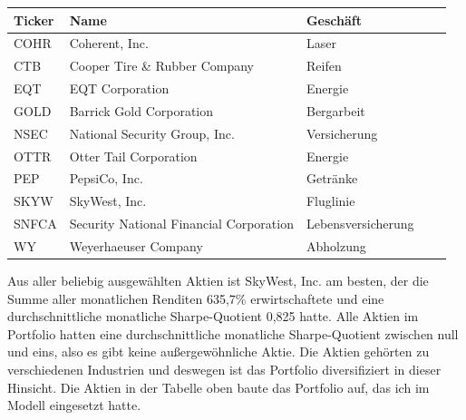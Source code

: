 \documentclass[12pt]{article}
\begin{document}
            \begin{table}[htp]
                \begin{center}
                    
                    \begin{tabular}{ | l | l | l | l | l | }

                        \hline
                        \textbf{Ticker}      & \textbf{Name}                             & \textbf{Geschäft} \\
                        \hline
                        COHR                 & Coherent, Inc.                            & Laser \\
                        CTB                  & Cooper Tire \& Rubber Company             & Reifen \\
                        EQT                  & EQT Corporation                           & Energie \\
                        GOLD                 & Barrick Gold Corporation                  & Bergarbeit \\
                        NSEC                 & National Security Group, Inc.             & Versicherung \\
                        OTTR                 & Otter Tail Corporation                    & Energie \\
                        PEP                  & PepsiCo, Inc.                             & Getränke \\
                        SKYW                 & SkyWest, Inc.                             & Fluglinie \\
                        SNFCA                & Security National Financial Corporation   & Lebensversicherung \\
                        WY                   & Weyerhaeuser Company                      & Abholzung \\
                        \hline

                    \end{tabular}

                \end{center}
            \end{table}

            Aus aller beliebig ausgewählten Aktien ist SkyWest, Inc. am besten, 
            der die Summe aller monatlichen Renditen 635,7\% erwirtschaftete und
            eine durchschnittliche monatliche Sharpe-Quotient 0,825 hatte.
            Alle Aktien im Portfolio hatten eine durchschnittliche monatliche Sharpe-Quotient zwischen null und eins,
            also es gibt keine außergewöhnliche Aktie. Die Aktien gehörten zu verschiedenen Industrien und
            deswegen ist das Portfolio diversifiziert in dieser Hinsicht. Die Aktien in der Tabelle oben baute das Portfolio auf,
            das ich im Modell eingesetzt hatte.
\end{document}
